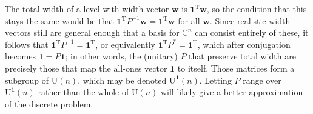 \documentclass{article}
\newcommand{\C}{\mathbb{C}}
\newcommand{\transpose}[1]{#1^{\mathrm{T}}}
\newcommand{\vek}{\mathbf}
\newcommand{\UOne}{\mathrm{U}^{\vek{1}}}
\theoremstyle{definition}
\begin{document}
The total width of a level with width vector $\vek{w}$ is 
$\transpose{\vek{1}} \vek{w}$, so the condition that this stays the 
same would be that \(\transpose{\vek{1}} P^{-1} \vek{w} = 
\transpose{\vek{1}} \vek{w}\) for all $\vek{w}$. Since realistic 
width vectors still are general enough that a basis for $\C^n$ can 
consist entirely of these, it follows that \(\transpose{\vek{1}} P^{-1} 
= \transpose{\vek{1}}\), or equivalently \(\transpose{\vek{1}} P^* = 
\transpose{\vek{1}}\), which after conjugation becomes \(\vek{1} = 
P \vek{1}\); in other words, the (unitary) $P$ that preserve total 
width are precisely those that map the all-ones vector $\vek{1}$ to 
itself. Those matrices form a 
subgroup of $\mathrm{U}(n)$, which may be denoted $\UOne(n)$. Letting 
$P$ range over $\UOne(n)$ rather than the whole of $\mathrm{U}(n)$ 
will likely give a better approximation of the discrete problem.
\end{document}
